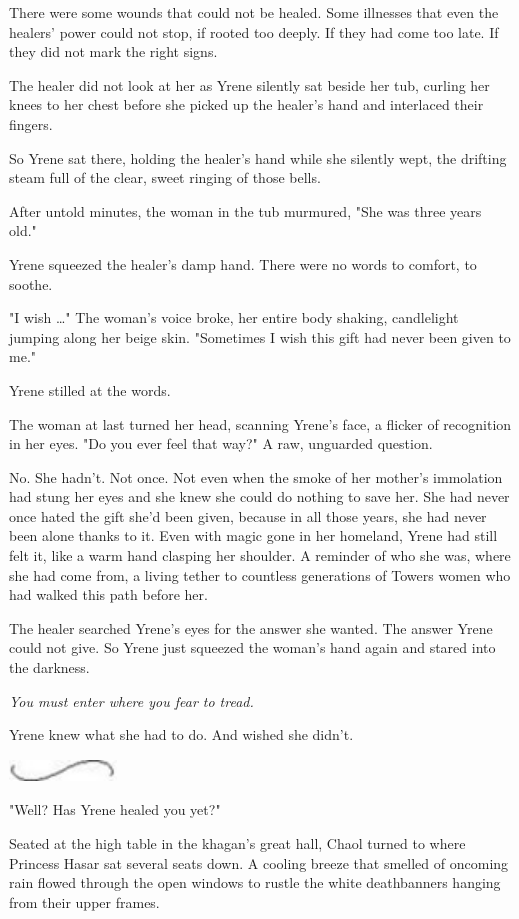 There were some wounds that could not be healed. Some illnesses that even the healers' power could not stop, if rooted too deeply. If they had come too late. If they did not mark the right signs.

The healer did not look at her as Yrene silently sat beside her tub, curling her knees to her chest before she picked up the healer's hand and interlaced their fingers.

So Yrene sat there, holding the healer's hand while she silently wept, the drifting steam full of the clear, sweet ringing of those bells.

After untold minutes, the woman in the tub murmured, "She was three years old."

Yrene squeezed the healer's damp hand. There were no words to comfort, to soothe.

"I wish \ldots" The woman's voice broke, her entire body shaking, candlelight jumping along her beige skin. "Sometimes I wish this gift had never been given to me."

Yrene stilled at the words.

The woman at last turned her head, scanning Yrene's face, a flicker of recognition in her eyes. "Do you ever feel that way?" A raw, unguarded question.

No. She hadn't. Not once. Not even when the smoke of her mother's immolation had stung her eyes and she knew she could do nothing to save her. She had never once hated the gift she'd been given, because in all those years, she had never been alone thanks to it. Even with magic gone in her homeland, Yrene had still felt it, like a warm hand clasping her shoulder. A reminder of who she was, where she had come from, a living tether to countless generations of Towers women who had walked this path before her.

The healer searched Yrene's eyes for the answer she wanted. The answer Yrene could not give. So Yrene just squeezed the woman's hand again and stared into the darkness.

\emph{You must enter where you fear to tread.}

Yrene knew what she had to do. And wished she didn't.

\includegraphics[width=1.12in,height=0.24in]{images/seperator}

"Well? Has Yrene healed you yet?"

Seated at the high table in the khagan's great hall, Chaol turned to where Princess Hasar sat several seats down. A cooling breeze that smelled of oncoming rain flowed through the open windows to rustle the white deathbanners hanging from their upper frames.

